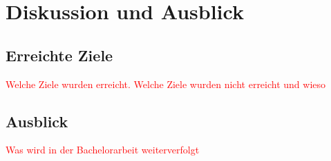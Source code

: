 



\chapter{Diskussion und Ausblick} %

\label{ChapterX} %


\section{Erreichte Ziele}
\textcolor{red}{Welche Ziele wurden erreicht. Welche Ziele wurden nicht erreicht und wieso}




\section{Ausblick}
\textcolor{red}{Was wird in der Bachelorarbeit weiterverfolgt}

